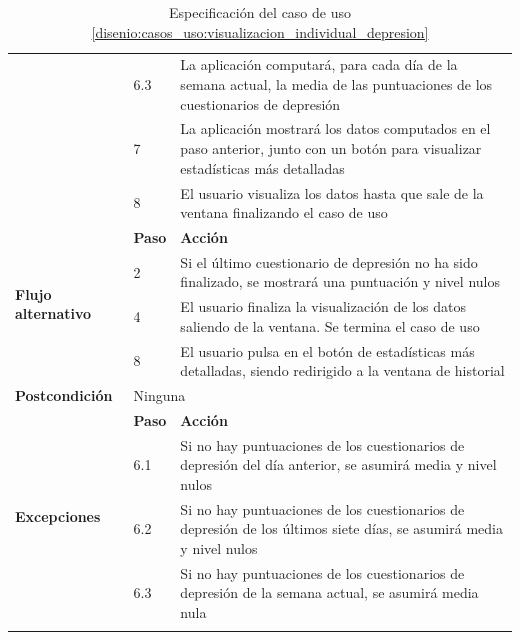 \begin{table}[h]
\begin{tabularx}{\textwidth}{|l|l|X|}
                    \cline{2-3} & 6.3 & La aplicación computará, para cada día de la semana actual, la media de las puntuaciones de los cuestionarios de depresión \\
                    \cline{2-3} & 7 & La aplicación mostrará los datos computados en el paso anterior, junto con un botón para visualizar estadísticas más detalladas \\
                    \cline{2-3} & 8 & El usuario visualiza los datos hasta que sale de la ventana finalizando el caso de uso \\
                    \hline
                    \multirow{4}{*}{\textbf{Flujo alternativo}} & \textbf{Paso} & \textbf{Acción} \\
                    \cline{2-3} & 2 & Si el último cuestionario de depresión no ha sido finalizado, se mostrará una puntuación y nivel nulos \\
                    \cline{2-3} & 4 & El usuario finaliza la visualización de los datos saliendo de la ventana. Se termina el caso de uso \\
                    \cline{2-3} & 8 & El usuario pulsa en el botón de estadísticas más detalladas, siendo redirigido a la ventana de historial \\
                    \hline
                    \textbf{Postcondición} & \multicolumn{2}{|X|}{Ninguna} \\
                    \hline
                    \multirow{4}{*}{\textbf{Excepciones}}  & \textbf{Paso} & \textbf{Acción} \\
                    \cline{2-3} & 6.1 & Si no hay puntuaciones de los cuestionarios de depresión del día anterior, se asumirá media y nivel nulos \\
                    \cline{2-3} & 6.2 & Si no hay puntuaciones de los cuestionarios de depresión de los últimos siete días, se asumirá media y nivel nulos \\
                    \cline{2-3} & 6.3 & Si no hay puntuaciones de los cuestionarios de depresión de la semana actual, se asumirá media nula \\
                    \hline
                    \caption{Especificación del caso de uso \ref{disenio:casos_uso:visualizacion_individual_depresion}}
                    \label{tabla:casos_uso:visualizacion_individual_depresion}
                \end{tabularx}
            \end{table}

